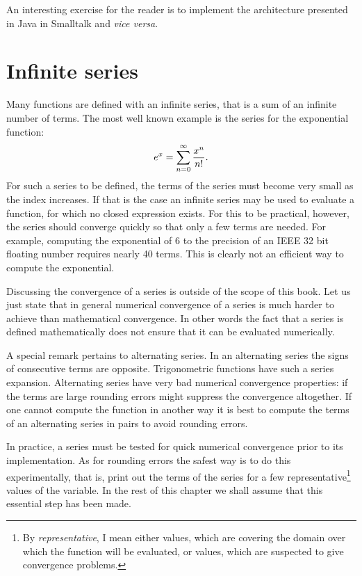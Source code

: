 \documentclass[twoside]{book}
\begin{document}
An interesting exercise for the reader is to implement the
architecture presented in Java in Smalltalk and {\it vice versa}.

\section{Infinite series}
Many functions are defined with an infinite series, that is a sum
of an infinite number of terms. The most well known example is the
series for the exponential function:
\begin{equation}
  e^x=\sum_{n=0}^{\infty}{x^n \over n!}.
\end{equation}
For such a series to be defined, the terms of the series must
become very small as the index increases. If that is the case an
infinite series may be used to evaluate a function, for which no
closed expression exists. For this to be practical, however, the
series should converge quickly so that only a few terms are
needed. For example, computing the exponential of 6 to the
precision of an IEEE 32 bit floating number requires nearly 40
terms. This is clearly not an efficient way to compute the
exponential.

Discussing the convergence of a series is outside of the scope of
this book. Let us just state that in general numerical convergence
of a series is much harder to achieve than mathematical
convergence. In other words the fact that a series is defined
mathematically does not ensure that it can be evaluated
numerically.

A special remark pertains to alternating series. In an alternating
series the signs of consecutive terms are opposite. Trigonometric
functions have such a series expansion. Alternating series have
very bad numerical convergence properties: if the terms are large
rounding errors might suppress the convergence altogether. If one
cannot compute the function in another way it is best to compute
the terms of an alternating series in pairs to avoid rounding
errors.

In practice, a series must be tested for quick numerical
convergence prior to its implementation. As for rounding errors
the safest way is to do this experimentally, that is, print out
the terms of the series for a few representative\footnote{By {\sl
representative}, I mean either values, which are covering the
domain over which the function will be evaluated, or values, which
are suspected to give convergence problems.} values of the
variable. In the rest of this chapter we shall assume that this
essential step has been made.
\end{document}
